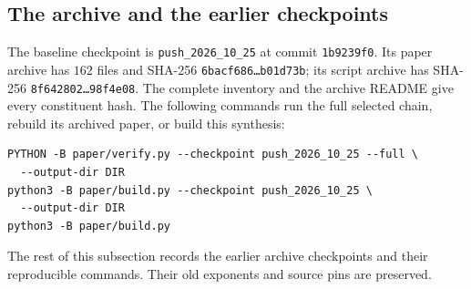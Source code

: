 \subsection{The archive and the earlier checkpoints}\label{subsec:cert:archive}

The baseline checkpoint is \texttt{push\_2026\_10\_25} at commit
\texttt{1b9239f0}. Its paper archive has $162$ files and SHA-256
\texttt{6bacf686\ldots{}b01d73b}; its script archive has SHA-256
\texttt{8f642802\ldots98f4e08}. The complete inventory and the archive
README give every constituent hash. The following commands run the full
selected chain, rebuild its archived paper, or build this synthesis:
\begin{verbatim}
PYTHON -B paper/verify.py --checkpoint push_2026_10_25 --full \
  --output-dir DIR
python3 -B paper/build.py --checkpoint push_2026_10_25 \
  --output-dir DIR
python3 -B paper/build.py
\end{verbatim}
The rest of this subsection records the earlier archive checkpoints and their
reproducible commands. Their old exponents and source pins are preserved.

